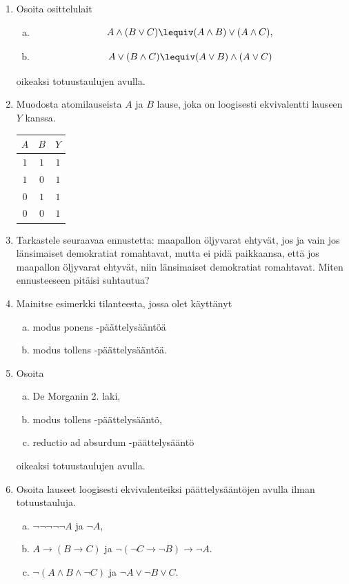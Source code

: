 \begin{enumerate}
\newpage

\item Osoita osittelulait
\begin{enumerate}[a)]
\item
\[
A \land (B \lor C) \lequiv (A \land B) \lor (A\land C),
\]
\item
\[
A \lor (B \land C) \lequiv (A \lor B) \land (A\lor C)
\]
\end{enumerate}
oikeaksi totuustaulujen avulla.

\item Muodosta atomilauseista $A$ ja $B$ lause, joka on
loogisesti ekvivalentti lauseen $Y$ kanssa.
\begin{center}
\begin{tabular}{|c|c|c|}\hline
$A$ & $B$ & $Y$\\ \hline
$1$ & $1$ & $1$\\
$1$ & $0$ & $1$\\
$0$ & $1$ & $1$\\

$0$ & $0$ & $1$\\ \hline
\end{tabular}
\end{center}

\item Tarkastele seuraavaa ennustetta: maapallon öljyvarat ehtyvät, jos ja vain jos länsimaiset demokratiat romahtavat, mutta ei pidä paikkaansa, että jos maapallon
öljyvarat ehtyvät, niin länsimaiset demokratiat romahtavat. Miten ennusteeseen pitäisi suhtautua?

\item Mainitse esimerkki tilanteesta, jossa olet käyttänyt
\begin{enumerate}[a)]
\item modus ponens -päättelysääntöä
\item modus tollens -päättelysääntöä.
\end{enumerate}

\item Osoita
\begin{enumerate}[a)]
\item De Morganin 2. laki,
\item modus tollens -päättelysääntö,
\item reductio ad absurdum -päättelysääntö
\end{enumerate}
oikeaksi totuustaulujen avulla.

\item Osoita lauseet loogisesti ekvivalenteiksi
päättelysääntöjen avulla ilman totuustauluja.
\begin{enumerate}[a)]
\item $\lnot \lnot \lnot \lnot \lnot A$ ja $\lnot A$,
\item $A \to (B \to C)$ ja $\lnot (\lnot C \to \lnot
B) \to \lnot A$.
\item $\lnot (A \land B \land \lnot C)$ ja $\lnot A
\lor \lnot B \lor C$.
\end{enumerate}


\end{enumerate}
